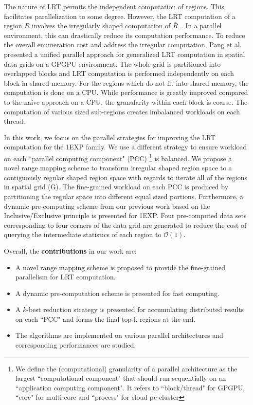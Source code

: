 \documentclass[AMA,LATO1COL]{WileyNJD-v2-bak}
\newcommand\bigo{\mathcal O}
\begin{document}
\noindent The nature of LRT permits the independent computation of regions. This facilitates parallelization to some degree. However, the LRT computation of a region $R$ involves the irregularly shaped computation of $\bar R$~\cite{apweb}. In a parallel environment, this can drastically reduce its computation performance\cite{irregular1,irregular2,irregular3}.
To reduce the overall enumeration cost and address the irregular computation, Pang et al.~\cite{apweb} presented a unified parallel approach for generalized LRT computation in spatial data grids on a GPGPU environment. The whole grid is partitioned into overlapped blocks and LRT computation is performed independently on each block in shared memory. For the regions which do not fit into shared memory, the computation is done on a CPU. While performance is greatly improved compared to the naive approach on a CPU, the granularity within each block is coarse. The computation of various sized sub-regions creates imbalanced workloads on each thread.

\noindent In this work, we focus on the parallel strategies for improving the LRT computation for the 1EXP family. We use a different strategy to ensure workload on each ``parallel computing component" (PCC) \footnote{We define the (computational) granularity of a parallel architecture as the largest ``computational component" that should run sequentially on an ``application computing component". It refers to ``block/thread" for GPGPU, ``core" for multi-core and ``process" for cloud pc-cluster} is balanced. We propose a novel range mapping scheme to transform irregular shaped region space to a contiguously regular shaped region space with regards to iterate all of the regions in spatial grid (G). The fine-grained workload on each PCC is produced by partitioning the regular space into different equal sized portions. Furthermore, a dynamic pre-computing scheme from our previous work\cite{apweb} based on the Inclusive/Exclusive principle is presented for 1EXP. Four pre-computed data sets corresponding to four corners of the data grid are generated to reduce the cost of querying the intermediate statistics of each region to $\bigo(1)$.

Overall, the {\bf contributions} in our work are:
\begin{itemize}
\renewcommand{\labelitemi}{$\bullet$}
\item A novel range mapping scheme is proposed to provide the fine-grained parallelism for LRT computation.
\item A dynamic pre-computation scheme is presented for fast computing.
\item A $k$-best reduction strategy is presented for accumulating distributed results on each ``PCC" and forms the final top-k regions at the end.
\item The algorithms are implemented on various parallel architectures and corresponding performances are studied.
\end{itemize}
\end{document}

